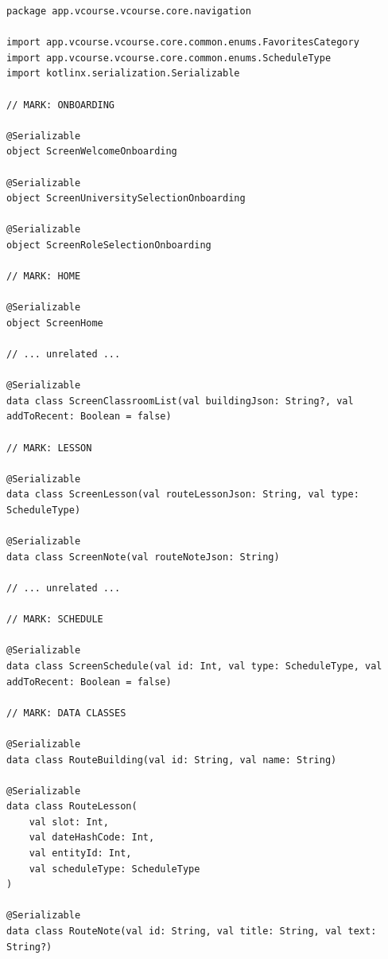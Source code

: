 \begin{lstlisting}[caption={Типизированная декларативная навигация Compose через \texttt{@Serializable}},label=lst:android-screens]
package app.vcourse.vcourse.core.navigation

import app.vcourse.vcourse.core.common.enums.FavoritesCategory
import app.vcourse.vcourse.core.common.enums.ScheduleType
import kotlinx.serialization.Serializable

// MARK: ONBOARDING

@Serializable
object ScreenWelcomeOnboarding

@Serializable
object ScreenUniversitySelectionOnboarding

@Serializable
object ScreenRoleSelectionOnboarding

// MARK: HOME

@Serializable
object ScreenHome

// ... unrelated ...

@Serializable
data class ScreenClassroomList(val buildingJson: String?, val addToRecent: Boolean = false)

// MARK: LESSON

@Serializable
data class ScreenLesson(val routeLessonJson: String, val type: ScheduleType)

@Serializable
data class ScreenNote(val routeNoteJson: String)

// ... unrelated ...

// MARK: SCHEDULE

@Serializable
data class ScreenSchedule(val id: Int, val type: ScheduleType, val addToRecent: Boolean = false)

// MARK: DATA CLASSES

@Serializable
data class RouteBuilding(val id: String, val name: String)

@Serializable
data class RouteLesson(
    val slot: Int,
    val dateHashCode: Int,
    val entityId: Int,
    val scheduleType: ScheduleType
)

@Serializable
data class RouteNote(val id: String, val title: String, val text: String?)
\end{lstlisting}

